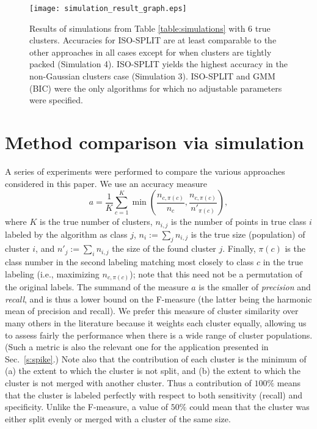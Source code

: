 \documentclass[10pt]{article}
\begin{document}
\begin{figure}
\begin{center}
\texttt{[image: simulation\_result\_graph.eps]}
\end{center}
\caption{
Results of simulations from Table \ref{table:simulations} with $6$ true clusters. Accuracies for ISO-SPLIT are at least comparable to the other approaches in all cases except for when clusters are tightly packed (Simulation 4). ISO-SPLIT yields the highest accuracy in the non-Gaussian clusters case (Simulation 3). ISO-SPLIT and GMM (BIC) were the only algorithms for which no adjustable parameters were specified.
}
\label{fig:result_bars}
\end{figure}

\section {Method comparison via simulation}
\label{algorithm_comparison}

A series of experiments were performed to compare the various approaches considered in this paper.
We use an accuracy measure
$$a=\frac{1}{K}\sum_{c=1}^K \min\left(\frac{n_{c,\pi(c)}}{n_c},\frac{n_{c,\pi(c)}}{n'_{\pi(c)}}\right),$$
where $K$ is the true number of clusters, $n_{i,j}$ is the number of points in true class $i$ labeled by the algorithm as class $j$, $n_i:=\sum_j n_{i,j}$ is the true size (population) of cluster $i$, and $n'_j:=\sum_i n_{i,j}$ the size of the found cluster $j$. Finally, $\pi(c)$ is the class number in the second labeling matching most closely to class $c$ in the true labeling (i.e., maximizing $n_{c,\pi(c)}$); note that this need not be a permutation of the original labels.
The summand of the measure $a$ is the smaller of {\em precision} and {\em recall}, and is thus a lower bound on
the F-measure \cite[Ch.~17]{zaki-book} (the latter being the harmonic mean of precision and recall).
We prefer this measure of cluster similarity over many others in the literature because it
weights each cluster equally, allowing us to assess fairly the performance when there is a wide range of cluster populations. (Such a metric is also the relevant one for the application presented in Sec.~\ref{s:spike}.)
Note also that the contribution of each cluster is the minimum of (a) the extent to which the cluster is not split, and (b) the extent to which the cluster is not merged with another cluster. Thus a contribution of $100\%$ means that the cluster is labeled perfectly with respect to both sensitivity (recall) and specificity. Unlike the F-measure, a value of $50\%$ could mean that the cluster was either split evenly or merged with a cluster of the same size.
\end{document}
